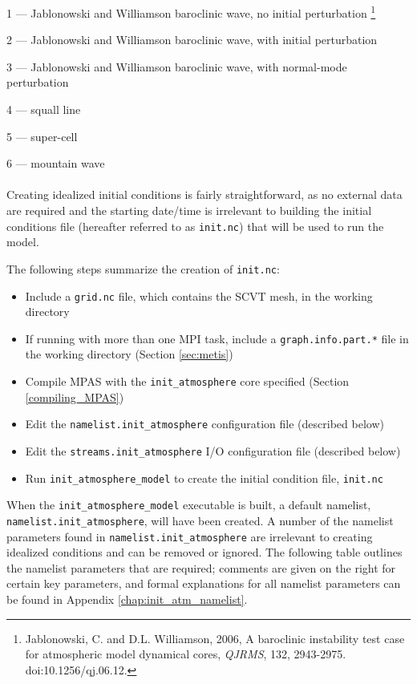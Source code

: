 1 --- Jablonowski and Williamson baroclinic wave, no initial perturbation
\footnote{Jablonowski, C. and D.L. Williamson, 2006, A baroclinic instability test case for atmospheric model dynamical cores, {\em QJRMS}, 132, 2943-2975. doi:10.1256/qj.06.12.}

2 --- Jablonowski and Williamson baroclinic wave, with initial perturbation

3 --- Jablonowski and Williamson baroclinic wave, with normal-mode perturbation

4 --- squall line

5 --- super-cell

6 --- mountain wave\\
\\
Creating idealized initial conditions is fairly straightforward, as no external data are required and the starting date/time is irrelevant to building the initial conditions file (hereafter referred to as {\tt init.nc}) that will be used to run the model.

The following steps summarize the creation of {\tt init.nc}:

\begin{itemize}
\item Include a {\tt grid.nc} file, which contains the SCVT mesh, in the working directory
\item If running with more than one MPI task, include a {\tt graph.info.part.*} file in the working directory (Section \ref{sec:metis})
\item Compile MPAS with the {\tt init\_atmosphere} core specified (Section \ref{compiling_MPAS})
\item Edit the {\tt namelist.init\_atmosphere} configuration file (described below)
\item Edit the {\tt streams.init\_atmosphere} I/O configuration file (described below)
\item Run {\tt init\_atmosphere\_model} to create the initial condition file, {\tt init.nc}
\end{itemize}

When the {\tt init\_atmosphere\_model} executable is built, a default namelist, {\tt namelist.init\_atmosphere}, will have been created. A number of the namelist parameters found in {\tt namelist.init\_atmosphere} are irrelevant to creating idealized conditions and can be removed or ignored.  The following table outlines the namelist parameters that are required; comments are given on the right for certain key parameters, and formal explanations for all namelist parameters can be found in Appendix \ref{chap:init_atm_namelist}.


